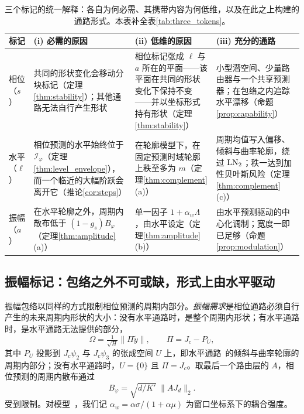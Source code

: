 {\begin{table}[t]
\centering
\caption{三个标记的统一解释：各自为何必需、其携带内容为何低维，以及在此之上构建的通路形式。本表补全表\ref{tab:three_tokens}。}
\label{tab:unified_view}
\footnotesize
\setlength{\tabcolsep}{4pt}
\begin{tabular}{@{}p{}p{}p{}p{}@{}}
\toprule
标记 & (i) 必需的原因 & (ii) 低维的原因 & (iii) 充分的通路 \\
\midrule
相位（$s$） & 共同的形状变化会移动分块标记（定理\ref{thm:stability}）；其他通路无法自行产生形状 & 相位标记张成 $\ell$ 与 $a$ 所在的平面——该平面在共同的形状变化下保持不变——并以坐标形式持有形状（定理\ref{thm:stability}） & 小型潜空间、少量路由器与一个共享预测器；在包络之内追踪水平漂移（命题\ref{prop:capability}） \\
\addlinespace
水平（$\ell$） & 相位预测的水平始终位于 $\mathcal I_\varphi$（定理\ref{thm:level_envelope}），而一个临近的大幅阶跃会离开它（推论\ref{cor:steps}） & 在轮廓模型下，在固定预测时域轮廓上秩至多为 $m$（定理\ref{thm:complement}(a)） & 周期均值写入偏移、倾斜与曲率轮廓，绕过 $\operatorname{LN}_2$；秩一达到加性贝叶斯风险（定理\ref{thm:complement}(c)） \\
\addlinespace
振幅（$a$） & 在水平轮廓之外，周期内散布低于 $(1-g_s)B_\varphi$（定理\ref{thm:amplitude}(a)） & 单一因子 $1+\alpha_w\Lambda$，由水平设定（定理\ref{thm:amplitude}(b)） & 由水平预测驱动的中心化调制；宽度一即已足够（命题\ref{prop:modulation}） \\
\bottomrule
\end{tabular}
\end{table}

\subsection{振幅标记：包络之外不可或缺，形式上由水平驱动}
\label{sec:theory_amplitude}

振幅包络以同样的方式限制相位预测的周期内部分。\emph{振幅需求}是相位通路必须自行产生的未来周期内形状的大小：没有水平通路时，是整个周期内形状；有水平通路时，是水平通路无法提供的部分，
\begin{equation}
\Omega=\tfrac{1}{\sqrt H}\|\Pi\tilde y\|,\qquad \Pi=J_c-P_U,
\label{eq:amplitude_demand}
\end{equation}
其中 $P_U$ 投影到 $J_c\psi_2$ 与 $J_c\psi_3$ 的张成空间 $U$ 上，即水平通路~的倾斜与曲率轮廓的周期内部分；没有水平通路时，$U=\{0\}$ 且 $\Pi=J_c$。取最后一个路由层的 $A$，相位预测的周期内散布通过
\begin{equation}
B_\varphi=\sqrt{d/K'}\;\|AJ_d\|_2 .
\label{eq:amplitude_constant}
\end{equation}
受到限制。对模型~，我们记 $\alpha_w=\alpha\sigma/(1+\alpha\mu)$ 为窗口坐标系下的耦合强度。

}

